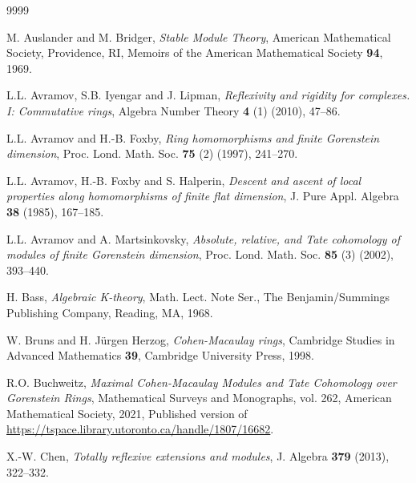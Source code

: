\documentclass{amsart}
\newcommand{\0}{{\bf{0}}}
\theoremstyle{definition}
\begin{document}
\begin{thebibliography}{9999}

 M. Auslander and M. Bridger,  \emph{Stable Module Theory}, American Mathematical Society, Providence, RI,
Memoirs of the American Mathematical Society {\bf 94}, 1969.



  L.L. Avramov, S.B. Iyengar and J. Lipman, {\em Reflexivity and rigidity for complexes. I: Commutative rings}, Algebra Number Theory {\bf 4} (1) (2010), 47--86.

  L.L. Avramov and H.-B. Foxby, {\em Ring homomorphisms and finite Gorenstein dimension}, Proc. Lond. Math. Soc.
{\bf 75} (2) (1997), 241--270.


 L.L. Avramov, H.-B. Foxby and S. Halperin, {\em Descent and ascent of local properties along homomorphisms of finite flat dimension}, J. Pure Appl. Algebra {\bf 38} (1985), 167--185.

 L.L. Avramov and A. Martsinkovsky, {\em Absolute, relative, and {Tate} cohomology of modules of finite {Gorenstein} dimension}, Proc. Lond. Math. Soc. {\bf 85} (3)  
 (2002), 393--440.

  H. Bass, {\em Algebraic K-theory}, Math. Lect. Note Ser., The Benjamin/Summings Publishing Company, Reading, MA, 1968.


  W. Bruns and H. J\"{u}rgen Herzog, {\em Cohen-Macaulay rings}, Cambridge Studies in Advanced Mathematics {\bf 39}, Cambridge University Press, 1998.


  R.O. Buchweitz,  {\em Maximal Cohen-Macaulay Modules and Tate Cohomology over Gorenstein Rings}, Mathematical Surveys and Monographs, vol. 262, American Mathematical Society, 2021, Published version of \url{https://tspace.library.utoronto.ca/handle/1807/16682}.

  X.-W. Chen, {\em Totally reflexive extensions and modules}, J. Algebra {\bf 379} (2013), 322--332.


\end{thebibliography}
\end{document}

